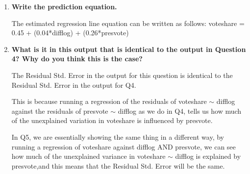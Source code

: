 \documentclass[12pt,letterpaper]{article}
\begin{document}
\begin{enumerate}
		
		\item \textbf{Write the prediction equation.}	\vspace{.25cm}
		
		\noindent The estimated regression line equation can be written as follows: 
		\newline voteshare = 0.45 + (0.04*difflog) + (0.26*presvote)
		
		\item \textbf{What is it in this output that is identical to the output in Question 4? Why do you think this is the case?}
		
		The Residual Std. Error	in the output for this question is identical to the 
		Residual Std. Error	in the output for Q4. 
		
		This is because running a regression of the residuals of voteshare $\sim$ difflog against 
		the residuals of presvote $\sim$ difflog as we do in Q4, tells us how much of the unexplained 
		variation in voteshare is influenced by presvote. 
		
		In Q5, we are essentially showing the same thing in a different way, by running 
		a regression of voteshare against difflog AND presvote, we can see how much of the unexplained 
		variance in voteshare $\sim$ difflog is explained by presvote,and this means that the Residual Std. Error will be the same.
		
	\end{enumerate}
	
	
	
	
\end{document}
